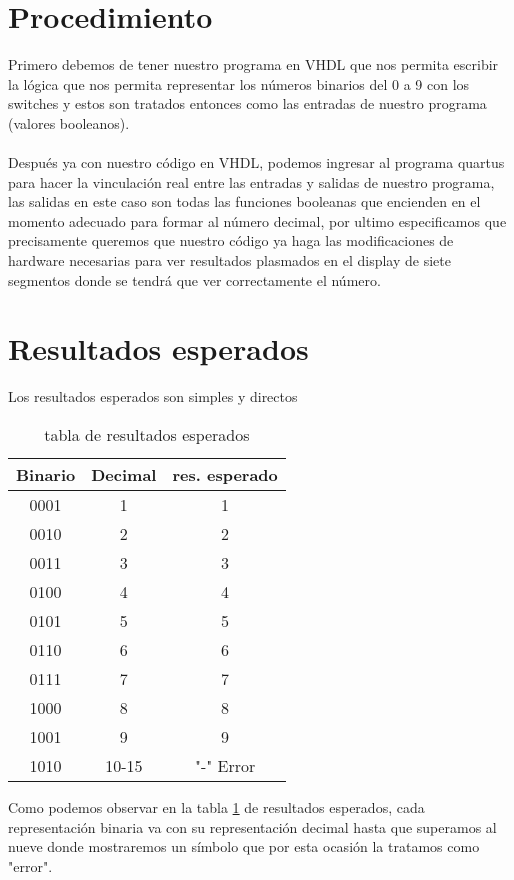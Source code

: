 \documentclass{article}
\begin{document}
\begin{multicols}{2}
\section{Procedimiento}\label{sec:procedim}
Primero debemos de tener nuestro programa en VHDL que nos permita escribir la lógica que nos permita representar los números binarios del 0 a 9 con los switches y estos son tratados entonces como las entradas de nuestro programa (valores booleanos).
\\
\\

Después ya con nuestro código en VHDL, podemos ingresar al programa quartus para hacer la vinculación real entre las entradas y salidas de nuestro programa, las salidas en este caso son todas las funciones booleanas que encienden en el momento adecuado para formar al número decimal, por ultimo especificamos que precisamente queremos que nuestro código ya haga las modificaciones de hardware necesarias para ver resultados plasmados en el display de siete segmentos donde se tendrá que ver correctamente el número.

\section{Resultados esperados}\label{sec:resEsperados}
Los resultados esperados son simples y directos
\begin{table}[H]
	\centering
	\begin{tabular}{|c|c|c|}
		\hline
		Binario & Decimal & res. esperado \\
		\hline
		0001 & 1 & 1 \\
		\hline
		0010 & 2 & 2 \\
		\hline
		0011 & 3 & 3 \\
		\hline
		0100 & 4 & 4 \\
		\hline
		0101 & 5 & 5 \\
		\hline
		0110 & 6 & 6 \\
		\hline
		0111 & 7 & 7 \\
		\hline
		1000 & 8 & 8 \\
		\hline
		1001 & 9 & 9 \\
		\hline
		1010 & 10-15 & "-" Error \\
		\hline
	\end{tabular}
	\caption{tabla de resultados esperados}
	\label{table:1}
\end{table}
Como podemos observar en la tabla \ref{table:1} de resultados esperados, cada representación binaria va con su representación decimal hasta que superamos al nueve donde mostraremos un símbolo que por esta ocasión la tratamos como "error".

\end{multicols}
\end{document}
